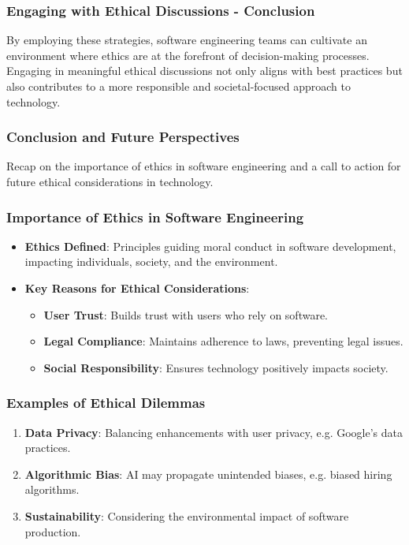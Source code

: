\documentclass{beamer}
\begin{document}
\begin{frame}[fragile]
    \frametitle{Engaging with Ethical Discussions - Conclusion}
    By employing these strategies, software engineering teams can cultivate an environment where ethics are at the forefront of decision-making processes. Engaging in meaningful ethical discussions not only aligns with best practices but also contributes to a more responsible and societal-focused approach to technology.
\end{frame}

\begin{frame}[fragile]
    \frametitle{Conclusion and Future Perspectives}
    Recap on the importance of ethics in software engineering and a call to action for future ethical considerations in technology.
\end{frame}

\begin{frame}[fragile]
    \frametitle{Importance of Ethics in Software Engineering}
    \begin{itemize}
        \item \textbf{Ethics Defined}: Principles guiding moral conduct in software development, impacting individuals, society, and the environment.
        \item \textbf{Key Reasons for Ethical Considerations}:
        \begin{itemize}
            \item \textbf{User Trust}: Builds trust with users who rely on software.
            \item \textbf{Legal Compliance}: Maintains adherence to laws, preventing legal issues.
            \item \textbf{Social Responsibility}: Ensures technology positively impacts society.
        \end{itemize}
    \end{itemize}
\end{frame}

\begin{frame}[fragile]
    \frametitle{Examples of Ethical Dilemmas}
    \begin{enumerate}
        \item \textbf{Data Privacy}: Balancing enhancements with user privacy, e.g. Google's data practices.
        \item \textbf{Algorithmic Bias}: AI may propagate unintended biases, e.g. biased hiring algorithms.
        \item \textbf{Sustainability}: Considering the environmental impact of software production.
    \end{enumerate}
\end{frame}
\end{document}
